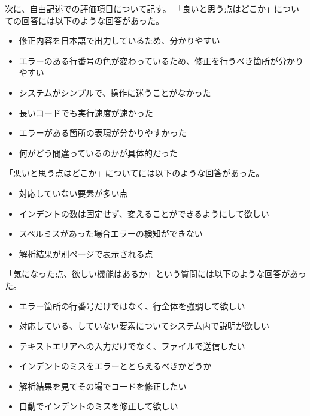 \documentclass{csspaper}
\begin{document}
      次に、自由記述での評価項目について記す。
      「良いと思う点はどこか」についての回答には以下のような回答があった。

      \begin{itemize}
         \item 修正内容を日本語で出力しているため、分かりやすい
         \item エラーのある行番号の色が変わっているため、修正を行うべき箇所が分かりやすい
         \item システムがシンプルで、操作に迷うことがなかった
         \item 長いコードでも実行速度が速かった
         \item エラーがある箇所の表現が分かりやすかった
         \item 何がどう間違っているのかが具体的だった
      \end{itemize}

      「悪いと思う点はどこか」についてには以下のような回答があった。

      \begin{itemize}
         \item 対応していない要素が多い点
         \item インデントの数は固定せず、変えることができるようにして欲しい
         \item スペルミスがあった場合エラーの検知ができない
         \item 解析結果が別ページで表示される点
      \end{itemize}

      「気になった点、欲しい機能はあるか」という質問には以下のような回答があった。

      \begin{itemize}
         \item エラー箇所の行番号だけではなく、行全体を強調して欲しい
         \item 対応している、していない要素についてシステム内で説明が欲しい
         \item テキストエリアへの入力だけでなく、ファイルで送信したい
         \item インデントのミスをエラーととらえるべきかどうか
         \item 解析結果を見てその場でコードを修正したい
         \item 自動でインデントのミスを修正して欲しい
      \end{itemize}
\end{document}
